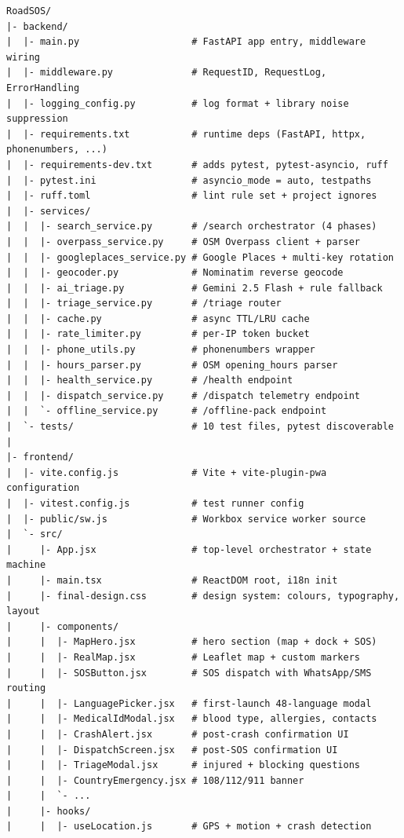 \documentclass[11pt, a4paper]{article}
\begin{document}
\begin{lstlisting}[language={},numbers=none,frame=none]
RoadSOS/
|- backend/
|  |- main.py                    # FastAPI app entry, middleware wiring
|  |- middleware.py              # RequestID, RequestLog, ErrorHandling
|  |- logging_config.py          # log format + library noise suppression
|  |- requirements.txt           # runtime deps (FastAPI, httpx, phonenumbers, ...)
|  |- requirements-dev.txt       # adds pytest, pytest-asyncio, ruff
|  |- pytest.ini                 # asyncio_mode = auto, testpaths
|  |- ruff.toml                  # lint rule set + project ignores
|  |- services/
|  |  |- search_service.py       # /search orchestrator (4 phases)
|  |  |- overpass_service.py     # OSM Overpass client + parser
|  |  |- googleplaces_service.py # Google Places + multi-key rotation
|  |  |- geocoder.py             # Nominatim reverse geocode
|  |  |- ai_triage.py            # Gemini 2.5 Flash + rule fallback
|  |  |- triage_service.py       # /triage router
|  |  |- cache.py                # async TTL/LRU cache
|  |  |- rate_limiter.py         # per-IP token bucket
|  |  |- phone_utils.py          # phonenumbers wrapper
|  |  |- hours_parser.py         # OSM opening_hours parser
|  |  |- health_service.py       # /health endpoint
|  |  |- dispatch_service.py     # /dispatch telemetry endpoint
|  |  `- offline_service.py      # /offline-pack endpoint
|  `- tests/                     # 10 test files, pytest discoverable
|
|- frontend/
|  |- vite.config.js             # Vite + vite-plugin-pwa configuration
|  |- vitest.config.js           # test runner config
|  |- public/sw.js               # Workbox service worker source
|  `- src/
|     |- App.jsx                 # top-level orchestrator + state machine
|     |- main.tsx                # ReactDOM root, i18n init
|     |- final-design.css        # design system: colours, typography, layout
|     |- components/
|     |  |- MapHero.jsx          # hero section (map + dock + SOS)
|     |  |- RealMap.jsx          # Leaflet map + custom markers
|     |  |- SOSButton.jsx        # SOS dispatch with WhatsApp/SMS routing
|     |  |- LanguagePicker.jsx   # first-launch 48-language modal
|     |  |- MedicalIdModal.jsx   # blood type, allergies, contacts
|     |  |- CrashAlert.jsx       # post-crash confirmation UI
|     |  |- DispatchScreen.jsx   # post-SOS confirmation UI
|     |  |- TriageModal.jsx      # injured + blocking questions
|     |  |- CountryEmergency.jsx # 108/112/911 banner
|     |  `- ...
|     |- hooks/
|     |  |- useLocation.js       # GPS + motion + crash detection

\end{lstlisting}
\end{document}
